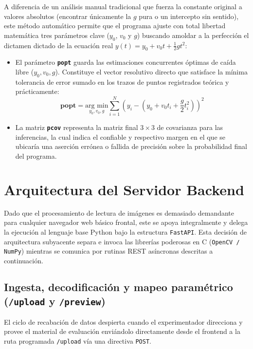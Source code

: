 \documentclass[12pt,a4paper]{article}
\begin{document}
A diferencia de un análisis manual tradicional que fuerza la constante original a valores absolutos (encontrar únicamente la $g$ pura o un intercepto sin sentido), este método automático permite que el programa ajuste con total libertad matemática tres parámetros clave ($y_0$, $v_0$ y $g$) buscando amoldar a la perfección el dictamen dictado de la ecuación real $ y(t) = y_0 + v_0 t + \frac{1}{2}gt^2$:

    \begin{itemize}
        \item El parámetro \textbf{\texttt{popt}} guarda las estimaciones concurrentes óptimas de caída libre ($y_0, v_0, g$). Constituye el vector resolutivo directo que satisface la mínima tolerancia de error sumado en los trazos de puntos registrados teórica y prácticamente:
        $$ \mathbf{popt} = \underset{y_0, v_0, g}{\text{arg min}} \sum_{i=1}^{N} \left( y_i - (y_0 + v_0t_i + \frac{g}{2}t_i^2) \right)^2 $$
        \item La matriz \textbf{\texttt{pcov}} representa la matriz final $3\times3$ de covarianza para las inferencias, la cual indica el confiable y respectivo margen en el que se ubicaría una aserción errónea o fallida de precisión sobre la probabilidad final del programa.
    \end{itemize}

\section{Arquitectura del Servidor Backend}
Dado que el procesamiento de lectura de imágenes es demasiado demandante para cualquier navegador web básico frontal, este se apoya integralmente y delega la ejecución al lenguaje base Python bajo la estructura \texttt{FastAPI}. Esta decisión de arquitectura subyacente separa e invoca las librerías poderosas en C (\texttt{OpenCV / NumPy}) mientras se comunica por rutinas REST asíncronas descritas a continuación.

\subsection{Ingesta, decodificación y mapeo paramétrico (\texttt{/upload} y \texttt{/preview})}
El ciclo de recabación de datos despierta cuando el experimentador direcciona y provee el material de evaluación enviándolo directamente desde el frontend a la ruta programada \texttt{/upload} vía una directiva \texttt{POST}. 
\end{document}
